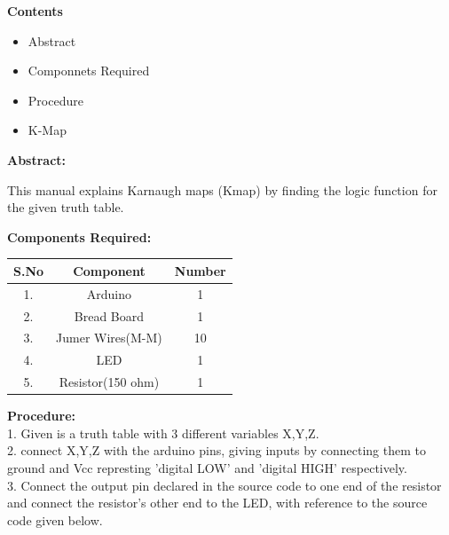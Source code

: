\documentclass[12pt,a4paper]{report}
\begin{document}
\begin{multicols}{2}
 \raggedright \large \textbf{Contents}\normalsize \vspace{2mm}
\begin{itemize}
 \raggedright \item Abstract \item Componnets Required \item Procedure\item K-Map
\end{itemize}
 \raggedright \large \textbf{Abstract:}\vspace{2mm}\\
\raggedright This manual explains Karnaugh maps (Kmap) by finding the logic function for the given truth table.\vspace{4mm} \\
\raggedright \large \textbf{Components Required:} \normalsize \vspace{2mm}
\begin{center}
    \label{tab:truthtable}
    \setlength{\arrayrulewidth}{0.1mm}
\setlength{\tabcolsep}{12pt}
\renewcommand{\arraystretch}{1.5}
    \begin{tabular}{|c|c|c|}
    \hline %
      \textbf{S.No} & \textbf{Component} & \textbf{Number}\\
      \hline
	1. & Arduino & 1 \\
	2. & Bread Board & 1 \\
	3. & Jumer Wires(M-M) & 10 \\
	4. & LED & 1 \\
	5. & Resistor(150 ohm) & 1 \\ 
      \hline
   \end{tabular}
 \end{center}
\vspace{5mm} 
 \raggedright \large \textbf{Procedure:} \normalsize \vspace{2mm}
\\ 1. Given is a truth table with 3 different variables X,Y,Z. \vspace{2mm}
\\ 2. connect X,Y,Z with the arduino pins, giving inputs by connecting them to ground and Vcc represting 'digital LOW' and 'digital HIGH' respectively. \vspace{2mm}
\\ 3. Connect the output pin declared in the source code to one end of the resistor and connect the resistor's other end to the LED, with reference to the source code given below. \vspace{2mm}

\end{multicols}
\end{document}
